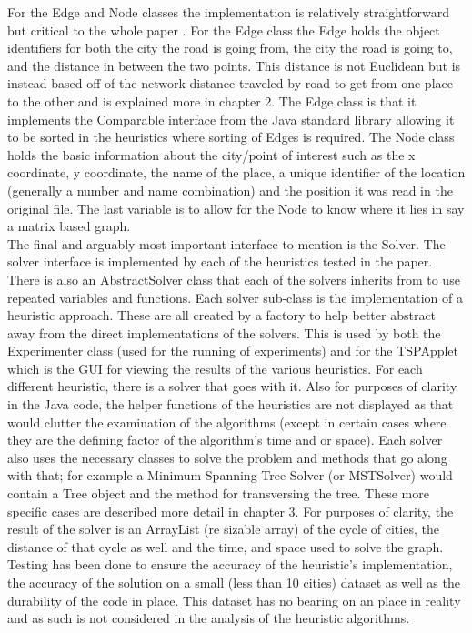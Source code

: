 \documentclass[midd]{thesis}
\newcommand{\tab}{\hspace*{2em}}
\begin{document}
\tab For the Edge and Node classes the implementation is relatively straightforward but critical to the whole paper . For the Edge class the Edge holds the object identifiers for both the city the road is going from, the city the road is going to, and the distance in between the two points. This distance is not Euclidean but is instead based off of the network distance traveled by road to get from one place to the other and is explained more in chapter 2. The Edge class is that it implements the Comparable interface from the Java standard library allowing it to be sorted in the heuristics where sorting of Edges is required. The Node class holds the basic information about the city/point of interest such as the x coordinate, y coordinate, the name of the place, a unique identifier of the location (generally a number and name combination) and the position it was read in the original file. The last variable is to allow for the Node to know where it lies in say a matrix based graph. \\  
\tab The final and arguably most important interface to mention is the Solver. The solver interface is implemented by each of the heuristics tested in the paper. There is also an AbstractSolver class that each of the solvers inherits from to use repeated variables and functions. Each solver sub-class is the implementation of a heuristic approach. These are all created by a factory to help better abstract away from the direct implementations of the solvers. This is used by both the Experimenter class (used for the running of experiments) and for the TSPApplet which is the GUI for viewing the results of the various heuristics. For each different heuristic, there is a solver that goes with it. Also for purposes of clarity in the Java code, the helper functions of the heuristics are not displayed as that would clutter the examination of the algorithms (except in certain cases where they are the defining factor of the algorithm's time and or space). Each solver also uses the necessary classes to solve the problem and methods that go along with that; for example a Minimum Spanning Tree Solver (or MSTSolver) would contain a Tree object and the method for transversing the tree. These more specific cases are described more detail in chapter 3. For purposes of clarity, the result of the solver is an ArrayList (re sizable array) of the cycle of cities, the distance of that cycle as well and the time, and space used to solve the graph. Testing has been done to ensure the accuracy of the heuristic's implementation, the accuracy of the solution on a small (less than 10 cities) dataset as well as the durability of the code in place. This dataset has no bearing on an place in reality and as such is not considered in the analysis of the heuristic algorithms.\\
\end{document}
